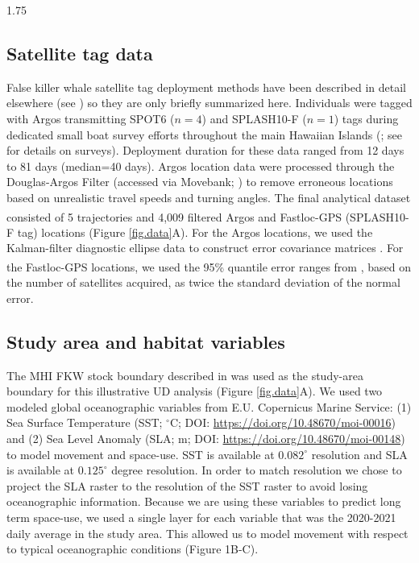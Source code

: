 \documentclass[12pt]{article}
\begin{document}
\begin{spacing}{1.75}
\subsection{Satellite tag data}

False killer whale satellite tag deployment methods have been described in detail elsewhere (see \citealt{baird2010movements, baird2012range}) so they are only briefly summarized here. Individuals were tagged with Argos transmitting SPOT6 ($n=4$) and SPLASH10-F ($n=1$) tags during dedicated small boat survey efforts throughout the main Hawaiian Islands (\citealt{baird2012range,baird2021bringing, baird2016lives}; see \citealt{baird2013odontocete} for details on surveys). Deployment duration for these data ranged from 12 days to 81 days (median=40 days). Argos location data were processed through the Douglas-Argos Filter (accessed via Movebank; \citealt{kranstauber2011movebank,douglas2012moderating}) to remove erroneous locations based on unrealistic travel speeds and turning angles. The final analytical dataset consisted of 5 trajectories and 4,009 filtered Argos and Fastloc\textsuperscript{\textregistered}-GPS (SPLASH10-F tag) locations (Figure \ref{fig.data}A). For the Argos locations, we used the Kalman-filter diagnostic ellipse data to construct error covariance matrices \citep{mcclintock2015modelling}. For the Fastloc\textsuperscript{\textregistered}-GPS locations, we used the 95\% quantile error ranges from \cite{dujon2014accuracy}, based on the number of satellites acquired, as twice the standard deviation of the normal error.       

\subsection{Study area and habitat variables}



The MHI FKW stock boundary described in \cite{BradfordEtAl2015a} was used as the study-area boundary for this illustrative UD analysis (Figure \ref{fig.data}A). We used two modeled global oceanographic variables from E.U. Copernicus Marine Service: (1) Sea Surface Temperature (SST; $^\circ$C; DOI: \url{https://doi.org/10.48670/moi-00016}) and (2) Sea Level Anomaly (SLA; m; DOI: \url{https://doi.org/10.48670/moi-00148}) to model movement and space-use. SST is available at $0.082^\circ$ resolution and SLA is available at $0.125^\circ$ degree resolution. In order to match resolution we chose to project the SLA raster to the resolution of the SST raster to avoid losing oceanographic information. Because we are using these variables to predict long term space-use, we used a single layer for each variable that was the 2020-2021 daily average in the study area. This allowed us to model movement with respect to typical oceanographic conditions (Figure 1B-C). 


\end{spacing}
\end{document}
